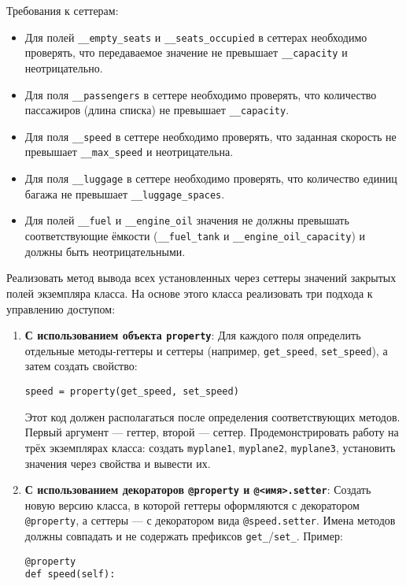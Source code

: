 \begin{enumerate}
Требования к сеттерам:
\begin{itemize}
    \item Для полей \texttt{\_\_empty\_seats} и \texttt{\_\_seats\_occupied} в сеттерах необходимо проверять, что передаваемое значение не превышает \texttt{\_\_capacity} и неотрицательно.  
    \item Для поля \texttt{\_\_passengers} в сеттере необходимо проверять, что количество пассажиров (длина списка) не превышает \texttt{\_\_capacity}.  
    \item Для поля \texttt{\_\_speed} в сеттере необходимо проверять, что заданная скорость не превышает \texttt{\_\_max\_speed} и неотрицательна.  
    \item Для поля \texttt{\_\_luggage} в сеттере необходимо проверять, что количество единиц багажа не превышает \texttt{\_\_luggage\_spaces}.
    \item Для полей \texttt{\_\_fuel} и \texttt{\_\_engine\_oil} значения не должны превышать соответствующие ёмкости (\texttt{\_\_fuel\_tank} и \texttt{\_\_engine\_oil\_capacity}) и должны быть неотрицательными.
\end{itemize}
Реализовать метод вывода всех установленных через сеттеры значений закрытых полей экземпляра класса.
На основе этого класса реализовать три подхода к управлению доступом:
\begin{enumerate}
    \item \textbf{С использованием объекта \texttt{property}}:  
    Для каждого поля определить отдельные методы-геттеры и сеттеры (например, \texttt{get\_speed}, \texttt{set\_speed}), а затем создать свойство:  
    \begin{verbatim}
speed = property(get_speed, set_speed)
    \end{verbatim}  
    Этот код должен располагаться после определения соответствующих методов. Первый аргумент — геттер, второй — сеттер.  
    Продемонстрировать работу на трёх экземплярах класса: создать \texttt{myplane1}, \texttt{myplane2}, \texttt{myplane3}, установить значения через свойства и вывести их.
    \item \textbf{С использованием декораторов \texttt{@property} и \texttt{@<имя>.setter}}:  
    Создать новую версию класса, в которой геттеры оформляются с декоратором \texttt{@property}, а сеттеры — с декоратором вида \texttt{@speed.setter}. Имена методов должны совпадать и не содержать префиксов \texttt{get\_}/\texttt{set\_}.  
    Пример:  
    \begin{verbatim}
@property
def speed(self):

\end{verbatim}
\end{enumerate}
\end{enumerate}
